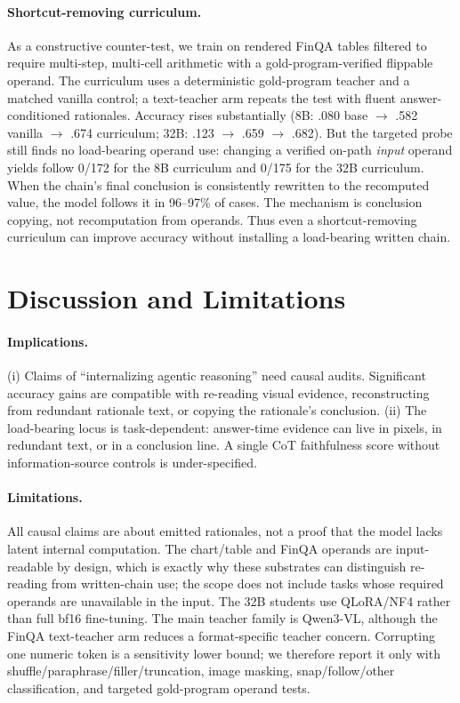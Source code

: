 \documentclass[11pt]{article}
\begin{document}
\paragraph{Shortcut-removing curriculum.}
As a constructive counter-test, we train on rendered FinQA tables filtered to require multi-step, multi-cell arithmetic with a gold-program-verified flippable operand. The curriculum uses a deterministic gold-program teacher and a matched vanilla control; a text-teacher arm repeats the test with fluent answer-conditioned rationales. Accuracy rises substantially (8B: .080 base $\to$ .582 vanilla $\to$ .674 curriculum; 32B: .123 $\to$ .659 $\to$ .682). But the targeted probe still finds no load-bearing operand use: changing a verified on-path \emph{input} operand yields follow 0/172 for the 8B curriculum and 0/175 for the 32B curriculum. When the chain's final conclusion is consistently rewritten to the recomputed value, the model follows it in 96--97\% of cases. The mechanism is conclusion copying, not recomputation from operands. Thus even a shortcut-removing curriculum can improve accuracy without installing a load-bearing written chain.

\section{Discussion and Limitations}
\label{sec:discussion}

\paragraph{Implications.}
(i) Claims of ``internalizing agentic reasoning'' need causal audits. Significant accuracy gains are compatible with re-reading visual evidence, reconstructing from redundant rationale text, or copying the rationale's conclusion. (ii) The load-bearing locus is task-dependent: answer-time evidence can live in pixels, in redundant text, or in a conclusion line. A single CoT faithfulness score without information-source controls is under-specified.

\paragraph{Limitations.}
All causal claims are about emitted rationales, not a proof that the model lacks latent internal computation. The chart/table and FinQA operands are input-readable by design, which is exactly why these substrates can distinguish re-reading from written-chain use; the scope does not include tasks whose required operands are unavailable in the input. The 32B students use QLoRA/NF4 rather than full bf16 fine-tuning. The main teacher family is Qwen3-VL, although the FinQA text-teacher arm reduces a format-specific teacher concern. Corrupting one numeric token is a sensitivity lower bound; we therefore report it only with shuffle/paraphrase/filler/truncation, image masking, snap/follow/other classification, and targeted gold-program operand tests.
\end{document}
